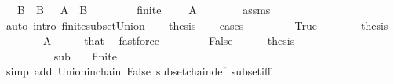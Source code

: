 \begin{isabellebody}
\ \ \ B\ \ {\isachardoublequoteopen}B\ {\isasymin}\ {\isasymB}{\isachardoublequoteclose}\ {\isachardoublequoteopen}A\ {\isasymsubseteq}\ B{\isachardoublequoteclose}\isanewline
%
\isadelimproof
%
\endisadelimproof
%
\isatagproof
{}\isamarkupfalse%
\ {\isacharminus}{\kern0pt}\isanewline
\ \ \isamarkupfalse%
\ {\isasymF}\ \ {\isasymF}{\isacharcolon}{\kern0pt}\ {\isachardoublequoteopen}finite\ {\isasymF}{\isachardoublequoteclose}\ {\isachardoublequoteopen}{\isasymF}\ {\isasymsubseteq}\ {\isasymB}{\isachardoublequoteclose}\ {\isachardoublequoteopen}A\ {\isasymsubseteq}\ {\isasymUnion}{\isasymF}{\isachardoublequoteclose}\isanewline
\ \ \ \ \isamarkupfalse%
\ assms\ \isamarkupfalse%
\ {\isacharparenleft}{\kern0pt}auto\ intro{\isacharcolon}{\kern0pt}\ finite{\isacharunderscore}{\kern0pt}subset{\isacharunderscore}{\kern0pt}Union{\isacharparenright}{\kern0pt}\isanewline
\ \ \isamarkupfalse%
\ thesis\isanewline
\ \ \isamarkupfalse%
\ {\isacharparenleft}{\kern0pt}cases\ {\isachardoublequoteopen}{\isasymF}\ {\isacharequal}{\kern0pt}\ {\isacharbraceleft}{\kern0pt}{\isacharbraceright}{\kern0pt}{\isachardoublequoteclose}{\isacharparenright}{\kern0pt}\isanewline
\ \ \ \ \isamarkupfalse%
\ True\isanewline
\ \ \ \ \isamarkupfalse%
\ \isamarkupfalse%
\ {\isacharquery}{\kern0pt}thesis\isanewline
\ \ \ \ \ \ \isamarkupfalse%
\ {\isacartoucheopen}A\ {\isasymsubseteq}\ {\isasymUnion}{\isasymF}{\isacartoucheclose}\ {\isacartoucheopen}{\isasymB}\ {\isasymnoteq}\ {\isacharbraceleft}{\kern0pt}{\isacharbraceright}{\kern0pt}{\isacartoucheclose}\ that\ \isamarkupfalse%
\ fastforce\isanewline
\ \ \isamarkupfalse%
\isanewline
\ \ \ \ \isamarkupfalse%
\ False\isanewline
\ \ \ \ \isamarkupfalse%
\ {\isacharquery}{\kern0pt}thesis\isanewline
\ \ \ \ \isamarkupfalse%
\isanewline
\ \ \ \ \ \ \isamarkupfalse%
\ {\isachardoublequoteopen}{\isasymUnion}{\isasymF}\ {\isasymin}\ {\isasymB}{\isachardoublequoteclose}\isanewline
\ \ \ \ \ \ \ \ \isamarkupfalse%
\ sub\ {\isacartoucheopen}{\isasymF}\ {\isasymsubseteq}\ {\isasymB}{\isacartoucheclose}\ {\isacartoucheopen}finite\ {\isasymF}{\isacartoucheclose}\isanewline
\ \ \ \ \ \ \ \ \isamarkupfalse%
\ {\isacharparenleft}{\kern0pt}simp\ add{\isacharcolon}{\kern0pt}\ Union{\isacharunderscore}{\kern0pt}in{\isacharunderscore}{\kern0pt}chain\ False\ subset{\isachardot}{\kern0pt}chain{\isacharunderscore}{\kern0pt}def\ subset{\isacharunderscore}{\kern0pt}iff{\isacharparenright}{\kern0pt}\isanewline

\end{isabellebody}
